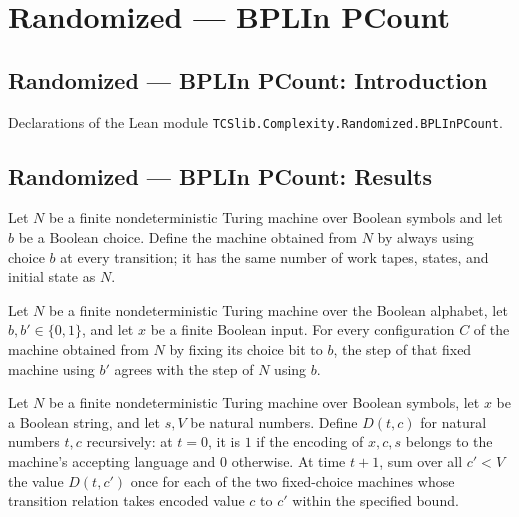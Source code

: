 \section{Randomized --- BPLIn PCount}
\subsection*{Randomized --- BPLIn PCount: Introduction}

Declarations of the Lean module \texttt{TCSlib.Complexity.Randomized.BPLInPCount}.

\subsection*{Randomized --- BPLIn PCount: Results}

\begin{definition}
\label{Randomized.BPLInP.fixCoin}
\leanok
{}
Let $N$ be a finite nondeterministic Turing machine over Boolean symbols and let $b$ be
a Boolean choice. Define the machine obtained from $N$ by always using choice $b$ at
every transition; it has the same number of work tapes, states, and initial state as
$N$.
\end{definition}

\begin{theorem}
\label{Randomized.BPLInP.stepWith_fixCoin}
\leanok
{}
Let $N$ be a finite nondeterministic Turing machine over the Boolean alphabet, let
$b,b'\in\{0,1\}$, and let $x$ be a finite Boolean input. For every configuration $C$ of
the machine obtained from $N$ by fixing its choice bit to $b$, the step of that fixed
machine using $b'$ agrees with the step of $N$ using $b$.
\end{theorem}

\begin{definition}
\label{Randomized.BPLInP.dpVal}
\leanok
{}
Let $N$ be a finite nondeterministic Turing machine over Boolean symbols, let $x$ be a
Boolean string, and let $s,V$ be natural numbers. Define $D(t,c)$ for natural numbers
$t,c$ recursively: at $t=0$, it is $1$ if the encoding of $x,c,s$ belongs to the
machine’s accepting language and $0$ otherwise. At time $t+1$, sum over all $c'<V$ the
value $D(t,c')$ once for each of the two fixed-choice machines whose transition relation
takes encoded value $c$ to $c'$ within the specified bound.
\end{definition}

